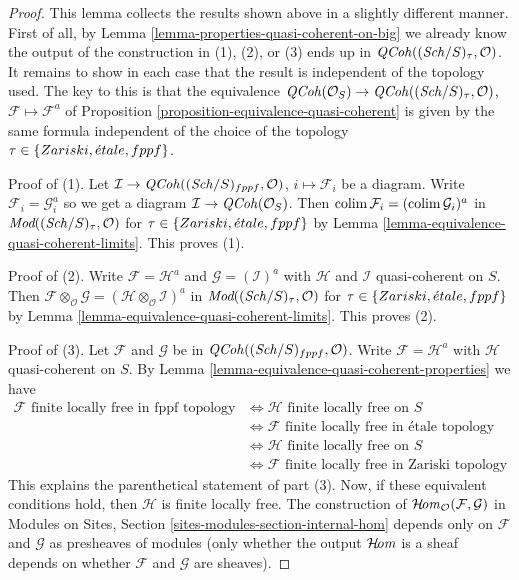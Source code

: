 \begin{proof}
This lemma collects the results shown above in a slightly different manner.
First of all, by Lemma \ref{lemma-properties-quasi-coherent-on-big}
we already know the output of the construction in (1), (2), or (3)
ends up in $\mathit{QCoh}((\mathit{Sch}/S)_\tau, \mathcal{O})$.
It remains to show in each case that the result is
independent of the topology used. The key to this is that the equivalence
$\mathit{QCoh}(\mathcal{O}_S) \to \mathit{QCoh}((\mathit{Sch}/S)_\tau, \mathcal{O})$,
$\mathcal{F} \mapsto \mathcal{F}^a$
of Proposition \ref{proposition-equivalence-quasi-coherent}
is given by the same formula independent of the choice
of the topology $\tau \in \{Zariski, {\acute{e}tale}, fppf\}$.

\medskip\noindent
Proof of (1). Let $\mathcal{I} \to \mathit{QCoh}((\mathit{Sch}/S)_{fppf}, \mathcal{O})$,
$i \mapsto \mathcal{F}_i$ be a diagram. Write
$\mathcal{F}_i = \mathcal{G}_i^a$ so we get a diagram
$\mathcal{I} \to \mathit{QCoh}(\mathcal{O}_S)$.
Then $\mathop{\mathrm{colim}}\nolimits \mathcal{F}_i = (\mathop{\mathrm{colim}}\nolimits \mathcal{G}_i)^a$ in
$\textit{Mod}((\mathit{Sch}/S)_\tau, \mathcal{O})$ for
$\tau \in \{Zariski, {\acute{e}tale}, fppf\}$
by Lemma \ref{lemma-equivalence-quasi-coherent-limits}.
This proves (1).

\medskip\noindent
Proof of (2). Write $\mathcal{F} = \mathcal{H}^a$ and
$\mathcal{G} = (\mathcal{I})^a$ with $\mathcal{H}$ and $\mathcal{I}$
quasi-coherent on $S$. Then
$\mathcal{F} \otimes_\mathcal{O} \mathcal{G} =
(\mathcal{H} \otimes_\mathcal{O} \mathcal{I})^a$ in
$\textit{Mod}((\mathit{Sch}/S)_\tau, \mathcal{O})$ for
$\tau \in \{Zariski, {\acute{e}tale}, fppf\}$
by Lemma \ref{lemma-equivalence-quasi-coherent-limits}.
This proves (2).

\medskip\noindent
Proof of (3). Let $\mathcal{F}$ and $\mathcal{G}$ be in
$\mathit{QCoh}((\mathit{Sch}/S)_{fppf}, \mathcal{O})$. Write
$\mathcal{F} = \mathcal{H}^a$ with $\mathcal{H}$
quasi-coherent on $S$. By
Lemma \ref{lemma-equivalence-quasi-coherent-properties} we have
\begin{align*}
\mathcal{F}\text{ finite locally free in fppf topology}
& \Leftrightarrow
\mathcal{H}\text{ finite locally free on }S \\
& \Leftrightarrow
\mathcal{F}\text{ finite locally free in \'etale topology} \\
& \Leftrightarrow
\mathcal{H}\text{ finite locally free on }S \\
& \Leftrightarrow
\mathcal{F}\text{ finite locally free in Zariski topology}
\end{align*}
This explains the parenthetical statement of part (3).
Now, if these equivalent conditions hold, then $\mathcal{H}$
is finite locally free. The construction of
$\mathop{\mathcal{H}\!\mathit{om}}\nolimits_\mathcal{O}(\mathcal{F}, \mathcal{G})$ in
Modules on Sites, Section \ref{sites-modules-section-internal-hom}
depends only on $\mathcal{F}$ and $\mathcal{G}$ as presheaves
of modules (only whether the output $\mathop{\mathcal{H}\!\mathit{om}}\nolimits$ is
a sheaf depends on whether $\mathcal{F}$ and $\mathcal{G}$ are
sheaves).
\end{proof}










